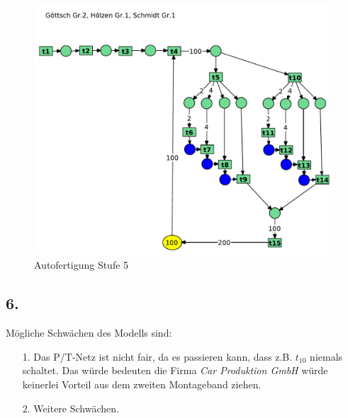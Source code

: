\documentclass[12pt, paper=a4]{article}
\begin{document}
\begin{figure}[h!]
\centering
\includegraphics[scale=0.7]{7-5-5.pdf}
\caption{Autofertigung Stufe 5}
\end{figure}

\subsection*{6.}
Mögliche Schwächen des Modells sind:
\begin{enumerate}
	\item [1.] Das P/T-Netz ist nicht fair, da es passieren kann, dass z.B. $t_{10}$ niemals schaltet. Das würde bedeuten die Firma \textit{Car Produktion GmbH} würde keinerlei Vorteil aus dem zweiten Montageband ziehen.
	\item [2.] Weitere Schwächen.
\end{enumerate}
\end{document}
